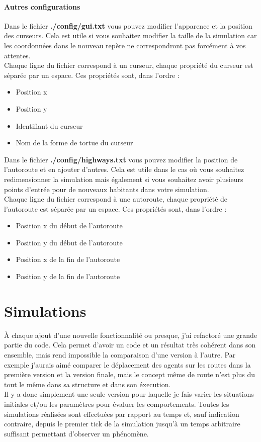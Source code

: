 \documentclass[11pt]{report}
\begin{document}
\newpage
\subsubsection{Autres configurations}
Dans le fichier \textbf{./config/gui.txt} vous pouvez modifier l'apparence et la position des curseurs.
Cela est utile si vous souhaitez modifier la taille de la simulation car les coordonnées dans le nouveau repère ne correspondront pas forcément à vos attentes.\\
Chaque ligne du fichier correspond à un curseur, chaque propriété du curseur est séparée par un espace. Ces propriétés sont, dans l'ordre :
\begin{itemize}
	\item Position x
	\item Position y
	\item Identifiant du curseur
	\item Nom de la forme de tortue du curseur
\end{itemize}
Dans le fichier \textbf{./config/highways.txt} vous pouvez modifier la position de l'autoroute et en ajouter d'autres.
Cela est utile dans le cas où vous souhaitez redimensionner la simulation mais également si vous souhaitez avoir plusieurs points d'entrée pour de nouveaux habitants dans votre simulation.\\
Chaque ligne du fichier correspond à une autoroute, chaque propriété de l'autoroute est séparée par un espace. Ces propriétés sont, dans l'ordre :
\begin{itemize}
	\item Position x du début de l'autoroute
	\item Position y du début de l'autoroute
	\item Position x de la fin de l'autoroute
	\item Position y de la fin de l'autoroute
\end{itemize}




\chapter{Simulations}
À chaque ajout d'une nouvelle fonctionnalité ou presque, j'ai refactoré une grande partie du code. Cela permet d'avoir un code et un résultat très cohérent dans son ensemble, mais rend impossible la comparaison d'une version à l'autre. Par exemple j'aurais aimé comparer le déplacement des agents sur les routes dans la première version et la version finale, mais le concept même de route n'est plus du tout le même dans sa structure et dans son éxecution.\\
Il y a donc simplement une seule version pour laquelle je fais varier les situations initiales et/ou les paramètres pour évaluer les comportements. Toutes les simulations réalisées sont effectuées par rapport au temps et, sauf indication contraire, depuis le premier tick de la simulation jusqu'à un temps arbitraire suffisant permettant d'observer un phénomène.
\end{document}
